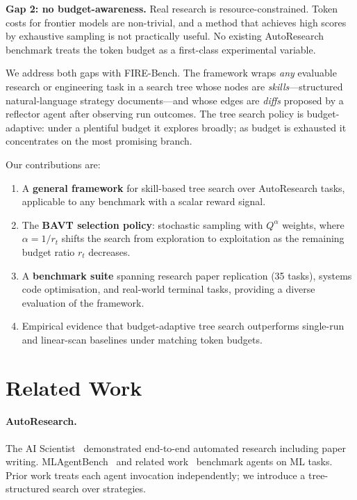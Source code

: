 \documentclass{article}
\begin{document}
\textbf{Gap 2: no budget-awareness.}
Real research is resource-constrained.
Token costs for frontier models are non-trivial, and a method that achieves high scores by exhaustive sampling is not practically useful.
No existing AutoResearch benchmark treats the token budget as a first-class experimental variable.

We address both gaps with FIRE-Bench.
The framework wraps \emph{any} evaluable research or engineering task in a search tree whose nodes are \emph{skills}---structured natural-language strategy documents---and whose edges are \emph{diffs} proposed by a reflector agent after observing run outcomes.
The tree search policy is budget-adaptive: under a plentiful budget it explores broadly; as budget is exhausted it concentrates on the most promising branch.

Our contributions are:
\begin{enumerate}
    \item A \textbf{general framework} for skill-based tree search over AutoResearch tasks, applicable to any benchmark with a scalar reward signal.
    \item The \textbf{BAVT selection policy}: stochastic sampling with $Q^\alpha$ weights, where $\alpha=1/r_t$ shifts the search from exploration to exploitation as the remaining budget ratio $r_t$ decreases.
    \item A \textbf{benchmark suite} spanning research paper replication (35 tasks), systems code optimisation, and real-world terminal tasks, providing a diverse evaluation of the framework.
    \item Empirical evidence that budget-adaptive tree search outperforms single-run and linear-scan baselines under matching token budgets.
\end{enumerate}

\section{Related Work}
\label{sec:related}

\paragraph{AutoResearch.}
The AI Scientist~\cite{ai_scientist} demonstrated end-to-end automated research including paper writing.
MLAgentBench~\cite{mlagentbench} and related work~\cite{autoresearch} benchmark agents on ML tasks.
Prior work treats each agent invocation independently; we introduce a tree-structured search over strategies.
\end{document}
